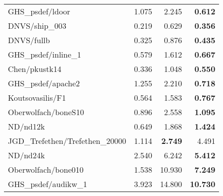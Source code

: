 \begin{tabular}{l|rr|r}
  GHS\_psdef/ldoor                & 1.075                     & 2.245     & \bf 0.612  \\
  DNVS/ship\_003                  & 0.219                     & 0.629     & \bf 0.356  \\
  DNVS/fullb                      & 0.325                     & 0.876     & \bf 0.435  \\
  GHS\_psdef/inline\_1            & 0.579                     & 1.612     & \bf 0.667  \\
  Chen/pkustk14                   & 0.336                     & 1.048     & \bf 0.550  \\
  GHS\_psdef/apache2              & 1.255                     & 2.210     & \bf 0.718  \\
  Koutsovasilis/F1                & 0.564                     & 1.583     & \bf 0.767  \\
  Oberwolfach/boneS10             & 0.896                     & 2.558     & \bf 1.095  \\
  ND/nd12k                        & 0.649                     & 1.868     & \bf 1.424  \\
  JGD\_Trefethen/Trefethen\_20000 & 1.114                     & \bf 2.749 & 4.491      \\
  ND/nd24k                        & 2.540                     & 6.242     & \bf 5.412  \\
  Oberwolfach/bone010             & 1.538                     & 10.930    & \bf 7.249  \\
  GHS\_psdef/audikw\_1            & 3.923                     & 14.800    & \bf 10.730 \\
  \hline
\end{tabular}
